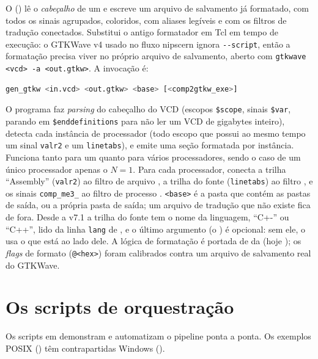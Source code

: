 O  () lê o \emph{cabeçalho} de um
 e escreve um arquivo de salvamento  já formatado, com
todos os sinais agrupados, coloridos, com aliases legíveis e com os filtros de
tradução conectados. Substitui o antigo formatador em Tcl em tempo de execução: o
GTKWave v4 usado no fluxo nipscern ignora \lstinline|--script|, então a formatação
precisa viver no próprio arquivo de salvamento, aberto com
\lstinline|gtkwave <vcd> -a <out.gtkw>|. A invocação é:

\begin{lstlisting}[language=bash]
gen_gtkw <in.vcd> <out.gtkw> <base> [<comp2gtkw_exe>]
\end{lstlisting}

O programa faz \emph{parsing} do cabeçalho do VCD (escopos \lstinline|$scope|,
sinais \lstinline|$var|, parando em \lstinline|$enddefinitions| para não ler um
VCD de gigabytes inteiro), detecta cada instância de processador (todo escopo que
possui ao mesmo tempo um sinal \lstinline|valr2| e um \lstinline|linetabs|), e
emite uma seção formatada por instância. Funciona tanto para um quanto para
vários processadores, sendo o caso de um único processador apenas o $N = 1$.
Para cada processador, conecta a trilha
\enquote{Assembly} (\lstinline|valr2|) ao filtro de arquivo
, a trilha do fonte (\lstinline|linetabs|) ao
filtro , e os sinais \lstinline|comp_me3_| ao
filtro de processo . \lstinline|<base>| é a pasta que contém as
pastas de saída, ou a própria pasta de saída; um arquivo de tradução que não
existe fica de fora. Desde a v7.1 a trilha do fonte tem o nome da linguagem,
\enquote{C+-} ou \enquote{C++}, lido da linha \lstinline|lang| de
, e o último argumento (o ) é opcional: sem
ele, o  usa o que está ao lado dele. A lógica de
formatação é portada de  da 
(hoje ); os
\emph{flags} de formato (\lstinline|@<hex>|) foram calibrados contra um arquivo de
salvamento real do GTKWave.

\section{Os scripts de orquestração}
\label{sec:yanc-scripts}

Os scripts em  demonstram e automatizam o pipeline ponta a ponta.
Os exemplos POSIX () têm contrapartidas Windows ().


